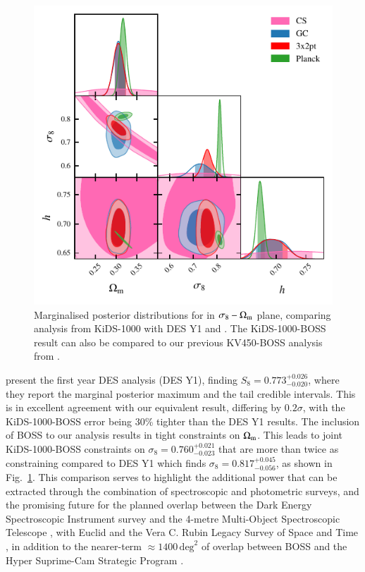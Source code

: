 \begin{figure}
	\begin{center}
		\includegraphics[width=\columnwidth]{Parameter_Plots/cosmology/omegam_sigma8_h_blind_C}
		\caption{Marginalised posterior distributions for in $\sigma_8-\Omega_{\rm m}$ plane, comparing \tttp analysis from KiDS-1000 with DES Y1 \citep{abbott/etal:2018} and \citep{planck/etal:2018}.   The KiDS-1000-BOSS result can also be compared to our previous KV450-BOSS analysis from \citet{troester/etal:2020}. 
		\label{fig:DES_KiDS_comp}}
	\end{center}
\end{figure}


\citet{abbott/etal:2018} present the first year \tttp DES analysis (DES Y1), finding $S_8=0.773^{+0.026}_{-0.020}$, where they report the marginal posterior maximum and the tail credible intervals.  
This is in excellent agreement with our equivalent result, differing by $0.2\sigma$, with the KiDS-1000-BOSS error being 30\% tighter than the DES Y1 results.  The inclusion of BOSS to our \tttp analysis results in tight constraints on $\Omega_{\rm m}$.  
This leads to joint KiDS-1000-BOSS constraints on $\sigma_8=0.760^{+0.021}_{-0.023}$ that are more than twice as constraining compared to DES Y1 which finds $\sigma_8=0.817^{+0.045}_{-0.056}$, as shown in Fig.~\ref{fig:DES_KiDS_comp}. 
This comparison serves to highlight the additional power that can be extracted through the combination of spectroscopic and photometric surveys,  and the promising future for the planned overlap between the Dark Energy Spectroscopic Instrument survey \citep{DESI/etal:2016} and the 4-metre Multi-Object Spectroscopic Telescope \citep[4MOST,][]{guiglion/etal:2019},
with Euclid and the Vera C. Rubin Legacy Survey of Space and Time \citep{laureijs/etal:2011,lsst/etal:2009}, in addition to the nearer-term $\approx\!1400\,\mathrm{deg}^{2}$ of overlap between BOSS and the Hyper Suprime-Cam Strategic Program \citep[HSC,][]{aihara/etal:2019}. 

